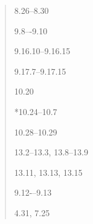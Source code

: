\documentclass[12pt]{extarticle}
\begin{document}
\begin{multicols*}{3}
\begin{minipage}{\columnwidth}
\begin{quote}
8.26--8.30
 
9.8–-9.10
 
9.16.10--9.16.15
 
9.17.7--9.17.15
 
10.20
 
*10.24--10.7
 
10.28--10.29
 
13.2--13.3, 13.8--13.9
 
13.11, 13.13, 13.15
 
9.12-–9.13
 
4.31, 7.25
 
\end{quote}
\end{minipage}

 

\end{multicols*}
\end{document}
